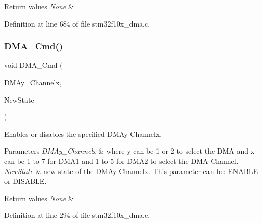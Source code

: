 \begin{DoxyRetVals}{Return values}
{\em None} & \\
\hline
\end{DoxyRetVals}


Definition at line 684 of file stm32f10x\+\_\+dma.\+c.

\mbox{\label{group___d_m_a___private___functions_ga8e7cb6b9ae5f142e2961df879cdaba65}} 
\subsubsection{\texorpdfstring{D\+M\+A\+\_\+\+Cmd()}{DMA\_Cmd()}}
{\footnotesize\ttfamily void D\+M\+A\+\_\+\+Cmd (\begin{DoxyParamCaption}\item[{\hyperlink{struct_d_m_a___channel___type_def}{D\+M\+A\+\_\+\+Channel\+\_\+\+Type\+Def} $\ast$}]{D\+M\+Ay\+\_\+\+Channelx,  }\item[{\hyperlink{group___exported__types_gac9a7e9a35d2513ec15c3b537aaa4fba1}{Functional\+State}}]{New\+State }\end{DoxyParamCaption})}



Enables or disables the specified D\+M\+Ay Channelx. 


\begin{DoxyParams}{Parameters}
{\em D\+M\+Ay\+\_\+\+Channelx} & where y can be 1 or 2 to select the D\+MA and x can be 1 to 7 for D\+M\+A1 and 1 to 5 for D\+M\+A2 to select the D\+MA Channel. \\
\hline
{\em New\+State} & new state of the D\+M\+Ay Channelx. This parameter can be\+: E\+N\+A\+B\+LE or D\+I\+S\+A\+B\+LE. \\
\hline
\end{DoxyParams}

\begin{DoxyRetVals}{Return values}
{\em None} & \\
\hline
\end{DoxyRetVals}


Definition at line 294 of file stm32f10x\+\_\+dma.\+c.

\mbox{\label{group___d_m_a___private___functions_ga21ca0d50b13e502db5ab5feb484f9ece}} 
